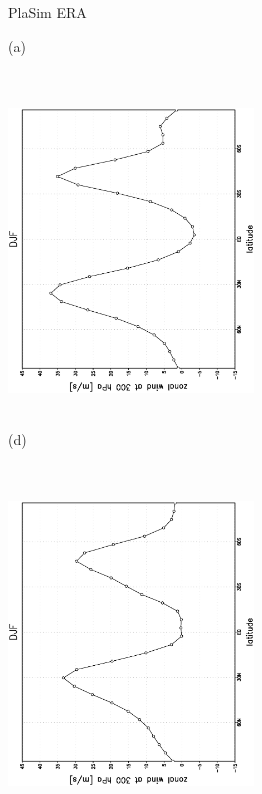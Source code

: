 \documentclass[12pt,a4paper,twoside,openright,headinclude,liststotoc,bibtotoc]{scrreprt}
\begin{document}
\begin{appendix}
\begin{figure}[c]
\hspace{4.0cm}PlaSim \vspace{0.2cm} \hspace{7.3cm} ERA \\
\parbox{8.5cm}{\hspace{0.90cm}\begin{scriptsize}(a) \end{scriptsize} \vspace{-0.5cm} \\
\includegraphics[height=8.5cm,width=6.5cm,angle=-90]
{eps/zonysmu_300DJF.eps}
}
\parbox{8.5cm}{\hspace{0.90cm}\begin{scriptsize}(d) \end{scriptsize} \vspace{-0.5cm} \\
\includegraphics[height=8.5cm,width=6.5cm,angle=-90]
{eps/t21zonysmuvel131DJF300.eps}
}
\end{figure}
\end{appendix}
\end{document}
